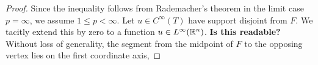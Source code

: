 \documentclass[10pt,a4paper]{article}
\newcommand{\todo}[1]{{\color{RedOrange}\textbf{#1}}}
\begin{document}
\begin{proof}
\begin{comment}
    There exists $w \in W^{1,p}(T)$ with $\nabla w = \nabla u$ and 
    \begin{gather*}
        \| w \|_{L^{p}(T)}
        \leq 
        C_{\PF,T,p} 
        \| \nabla w \|_{L^{p}(T)} %
        .
    \end{gather*}
    Then $w-u$ is constant, and thus $\gamma := \trace_{F} (w-u) = \trace_{F} w$. 
    We use that 
    \begin{gather*}
        \| \gamma \|_{L^{p}(T)}
        =
        \gamma \vol(T)^\frac{1}{p}
        =
        \left( \frac{ \vol(T) }{ \vol(F) } \right)^\frac{1}{p}
        \cdot 
        \gamma 
        \vol(F)^\frac{1}{p}
        =
        \left( \frac{ \vol(T) }{ \vol(F) } \right)^\frac{1}{p}
        \| \gamma \|_{L^{p}(F)}
        .
    \end{gather*}
    Using a trace inequality~\cite[Lemma~2.8]{veeser2012poincare} when $1 \leq p < \infty$, we find 
    \begin{align*}
        \| \gamma \|_{L^{p}(F)}^{p}
        &
        \leq 
        \frac{ \vol(F) }{ \vol(T) }
        \| w \|_{L^{p}(T)}^{p}
        +
        p
        \cdot 
        \diam(T)
        \frac{ \vol(F) }{ \vol(T) }
        \| w \|_{L^{p}(T)}^{p-1}
        \| \nabla w \|_{L^{p}(T)}
        \\&
        \leq 
        \left( \frac{ \vol(F) }{ \vol(T) } \right)
        \left( C_{\PF,T,p}^{p} + p \cdot C_{\PF,T,p}^{p-1} \right) 
        \diam(T)^{p}
        \| \nabla w \|_{L^{p}(T)}^{p}
        \\&
        \leq 
        \left( \frac{ \vol(F) }{ \vol(T) } \right)
        \left( C_{\PF,T,p}^{p} + p \cdot \diam(T) C_{\PF,T,p}^{p-1} \right) 
        \| \nabla w \|_{L^{p}(T)}^{p}
        .
    \end{align*}
    Recall that $u = w - \gamma$. The first inequality follows. 
\end{comment}
    Since the inequality follows from Rademacher's theorem in the limit case $p = \infty$,
    we assume $1 \leq p < \infty$. 
    Let $u \in C^{\infty}(T)$ have support disjoint from $F$.
    We tacitly extend this by zero to a function $u \in L^{\infty}({\mathbb R}^{n})$. 
    \todo{Is this readable?}
    Without loss of generality, 
    the segment from the midpoint of $F$ to the opposing vertex lies on the first coordinate axis,

\end{proof}
\end{document}
